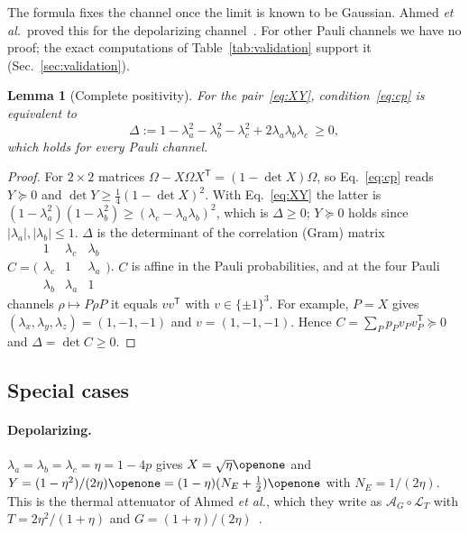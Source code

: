 \documentclass[aps,pra,reprint,superscriptaddress,nofootinbib,longbibliography,floatfix]{revtex4-2}
\newtheorem{lemma}{Lemma}
\theoremstyle{remark}
\newcommand{\one}{\openone}
\newcommand{\Amp}{\mathcal{A}}
\newcommand{\Loss}{\mathcal{L}}
\begin{document}
The formula fixes the channel once the limit is known to be Gaussian. Ahmed
\textit{et al.}\ proved this for the depolarizing channel~\cite{ahmed2026choir}. For other Pauli
channels we have no proof; the exact computations of Table~\ref{tab:validation} support it
(Sec.~\ref{sec:validation}).

\begin{lemma}[Complete positivity]
\label{lem:gram}
For the pair~\eqref{eq:XY}, condition~\eqref{eq:cp} is equivalent to
\begin{equation}
  \Delta:=1-\lambda_a^2-\lambda_b^2-\lambda_c^2+2\lambda_a\lambda_b\lambda_c\ \ge 0,
  \label{eq:gram}
\end{equation}
which holds for every Pauli channel.
\end{lemma}
\begin{proof}
For $2\times2$ matrices $\Omega-X\Omega X^{\mathsf T}=(1-\det X)\Omega$, so Eq.~\eqref{eq:cp} reads
$Y\succeq0$ and $\det Y\ge\frac14(1-\det X)^2$. With Eq.~\eqref{eq:XY} the latter is
$(1-\lambda_a^2)(1-\lambda_b^2)\ge(\lambda_c-\lambda_a\lambda_b)^2$, which is $\Delta\ge0$; $Y\succeq0$
holds since $|\lambda_a|,|\lambda_b|\le1$. $\Delta$ is the determinant of the correlation (Gram) matrix
$C=\bigl(\begin{smallmatrix}1&\lambda_c&\lambda_b\\ \lambda_c&1&\lambda_a\\ \lambda_b&\lambda_a&1\end{smallmatrix}\bigr)$.
$C$ is affine in the Pauli probabilities, and at the four Pauli channels
$\rho\mapsto P\rho P$ it equals $vv^{\mathsf T}$ with $v\in\{\pm1\}^3$. For example, $P=X$ gives
$(\lambda_x,\lambda_y,\lambda_z)=(1,-1,-1)$ and $v=(1,-1,-1)$. Hence
$C=\sum_Pp_Pv_Pv_P^{\mathsf T}\succeq0$ and $\Delta=\det C\ge0$.
\end{proof}

\subsection{Special cases}
\label{sec:special}
\paragraph*{Depolarizing.} $\lambda_a=\lambda_b=\lambda_c=\eta=1-4p$ gives $X=\sqrt\eta\one$ and
$Y=(1-\eta^2)/(2\eta)\one=(1-\eta)(N_E+\frac12)\one$ with $N_E=1/(2\eta)$. This is the thermal attenuator
of Ahmed \textit{et al.}, which they write as $\Amp_G\circ\Loss_T$ with $T=2\eta^2/(1+\eta)$ and
$G=(1+\eta)/(2\eta)$~\cite{ahmed2026choir}.
\end{document}
